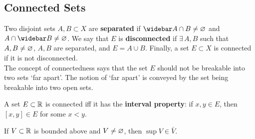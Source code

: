 \subsection{Connected Sets} 
Two disjoint sets $A,B\subset X$  are \textbf{separated} if $\bar{A}\cap B\neq \nullset$ and ${A}\cap \bar{B}\neq \nullset$. We say that $E$ is \textbf{disconnected} if $\exists\, A,B$ such that $A,B\neq \varnothing$, $A,B$ are separated, and $E=A\cup B$. Finally, a set $E\subset X$ is connected if it is not disconnected.\\
The concept of connectedness says that the set $E$ should not be breakable into two sets `far apart'. The notion of `far apart' is conveyed by the set being breakable into two open sets.

\begin{theorem}
A set $E\subset \mathbb{R}$ is connected iff it has the \textbf{interval property}: if $x,y\in E$, then $[x,y]\in E$ for some $x<y$.
\end{theorem}

\begin{lemma}
If $V\subset \mathbb{R}$ is bounded above and $V\neq \varnothing$, then $\sup{V}\in \bar{V}$.
\end{lemma}